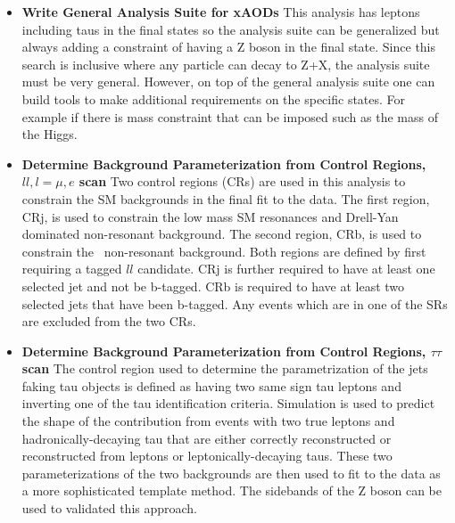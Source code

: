 \begin{itemize}[noitemsep,nolistsep,leftmargin=*]
\item[]{{\bf Write General Analysis Suite for xAODs} %
This analysis has leptons including taus in the final states so the analysis suite can be generalized but always adding a constraint of having a Z boson in the final state. 
Since this search is inclusive where any particle can decay to Z+X, the analysis suite must be very general. 
However, on top of the general analysis suite one can build tools to make additional requirements on the specific states. For example if there is mass constraint that can be imposed such as the mass of the Higgs.}

\item[]{{\bf Determine Background Parameterization from Control Regions, $ll, l=\mu, e$ scan}
Two control regions (CRs) are used in this analysis to constrain the SM backgrounds in the final fit to the data. The first region, CRj, is used to constrain the 
low mass SM resonances and Drell-Yan dominated non-resonant background. The second region, CRb, is used to constrain the \ttbar\ non-resonant background.
Both regions are defined by first requiring a tagged $ll$ candidate. CRj is further required to have
at least one selected jet and not be b-tagged. CRb is required to have at least two selected jets that have been b-tagged.
Any events which are in one of the SRs are excluded from the two CRs.}

\item[]{{\bf Determine Background Parameterization from Control Regions, $\tau\tau$ scan}
The control region used to determine the parametrization of the jets faking tau objects is defined as having two same sign tau leptons and inverting one of the tau identification criteria.
Simulation is used to predict the shape of the contribution from events with two true leptons and hadronically-decaying tau that are either correctly reconstructed or reconstructed
from leptons or leptonically-decaying taus.  These two parameterizations of the two backgrounds are then used to fit to the data as a more sophisticated template method.  The sidebands of the Z boson
can be used to validated this approach.}


\end{itemize}
